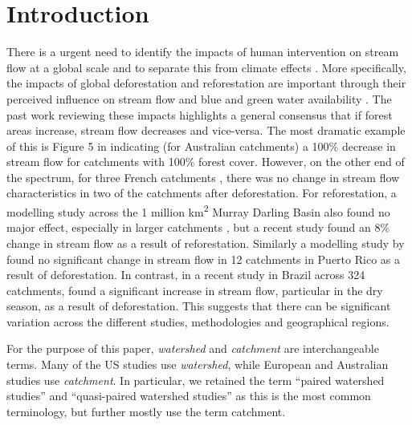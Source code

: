 \documentclass[]{elsarticle} %
\begin{document}
\hypertarget{introduction}{%
\section{Introduction}\label{introduction}}

There is a urgent need to identify the impacts of human intervention on stream flow at a global scale and to separate this from climate effects \citep{wang2020, hoekvandijke2022}. More specifically, the impacts of global deforestation and reforestation are important through their perceived influence on stream flow and blue and green water availability \citep{hoekvandijke2022, schyns2019}. The past work reviewing these impacts \citep{andreassian2004, jackson2005, zhang2017, brown2005, brown2013, filoso2017} highlights a general consensus that if forest areas increase, stream flow decreases and vice-versa. The most dramatic example of this is Figure 5 in \citet{zhang2011} indicating (for Australian catchments) a 100\% decrease in stream flow for catchments with 100\% forest cover. However, on the other end of the spectrum, for three French catchments \citep{cosandey2005}, there was no change in stream flow characteristics in two of the catchments after deforestation. For reforestation, a modelling study across the 1 million km\textsuperscript{2} Murray Darling Basin also found no major effect, especially in larger catchments \citep{vandijk2007}, but a recent study \citep{hoekvandijke2022} found an 8\% change in stream flow as a result of reforestation. Similarly a modelling study by \citet{beck2013} found no significant change in stream flow in 12 catchments in Puerto Rico as a result of deforestation. In contrast, in a recent study in Brazil across 324 catchments, \citet{levy2018} found a significant increase in stream flow, particular in the dry season, as a result of deforestation. This suggests that there can be significant variation across the different studies, methodologies and geographical regions.

For the purpose of this paper, \emph{watershed} and \emph{catchment} are interchangeable terms. Many of the US studies use \emph{watershed}, while European and Australian studies use \emph{catchment}. In particular, we retained the term ``paired watershed studies'' and ``quasi-paired watershed studies'' as this is the most common terminology, but further mostly use the term catchment.
\end{document}
